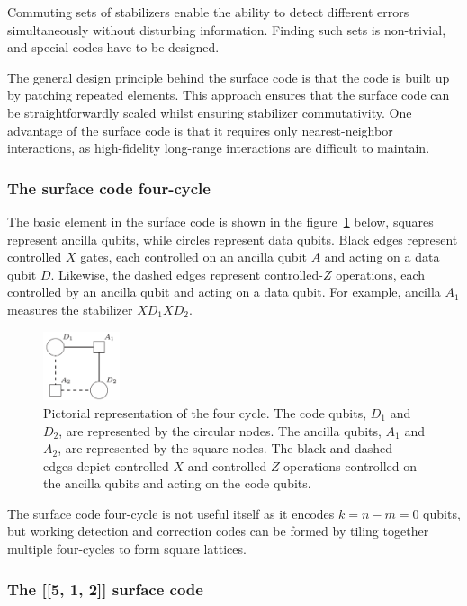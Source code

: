 Commuting sets of stabilizers enable the ability to detect different errors simultaneously without disturbing information. Finding such sets is non-trivial, and special codes have to be designed.

The general design principle behind the surface code is that the code is built up by patching repeated elements. This approach ensures that the surface code can be straightforwardly scaled whilst ensuring stabilizer commutativity. One advantage of the surface code is that it requires only nearest-neighbor interactions, as high-fidelity long-range interactions are difficult to maintain.

\subsubsection{The surface code four-cycle}

The basic element in the surface code is shown in the figure~\ref{fig:four_cycle} below, squares represent ancilla qubits, while circles represent data qubits. Black edges represent controlled $X$ gates, each controlled on an ancilla qubit $A$ and acting on a data qubit $D$. Likewise, the dashed edges represent controlled-$Z$ operations, each controlled by an ancilla qubit and acting on a data qubit.
For example, ancilla $A_1$ measures the stabilizer $XD_1XD_2$.
\begin{figure}[h]
    \centering
    \includegraphics[width=0.2\textwidth]{sections/2_review_surface_code/four_cycle.png}
    \caption{Pictorial representation of the four cycle. The code qubits, $D_1$ and $D_2$, are represented by the circular nodes. The ancilla qubits, $A_1$ and $A_2$, are represented by the square nodes. The black and dashed edges depict controlled-$X$ and controlled-$Z$ operations controlled on the ancilla qubits and acting on the code qubits.}
    \label{fig:four_cycle}
\end{figure}
The surface code four-cycle is not useful itself as it encodes $k=n-m=0$ qubits, but working detection and correction codes can be formed by tiling together multiple four-cycles to form square lattices.

\subsubsection{The [[5, 1, 2]] surface code}

